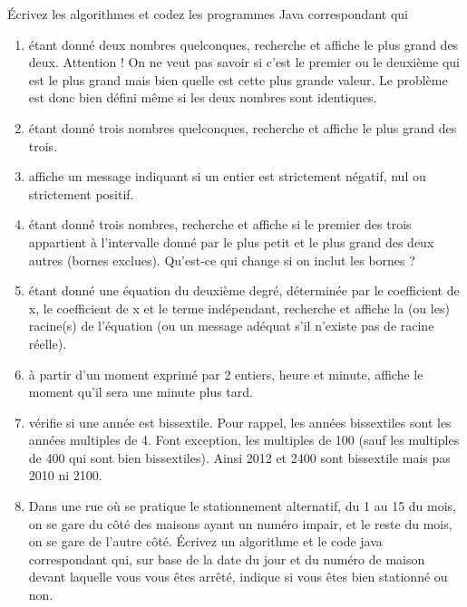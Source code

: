 \documentclass[11pt,a4paper]{article}
\begin{document}
            \par
        
        \'Ecrivez les algorithmes et codez les programmes Java correspondant qui 
          
					\begin{enumerate}
				
			\item \'etant donn\'e deux nombres quelconques, recherche et affiche le plus
              grand des deux. Attention ! On ne veut pas savoir si c'est le premier ou le deuxi\`eme qui est
              le plus grand mais bien quelle est cette plus grande valeur. Le probl\`eme est donc bien d\'efini
              m\^eme si les deux nombres sont identiques.
            
			\item \'etant donn\'e trois nombres quelconques, recherche et affiche le plus grand des trois.
			\item affiche un message indiquant si un entier est strictement n\'egatif, nul ou strictement positif.
			\item \'etant donn\'e trois nombres, recherche et affiche si le premier des 
            trois appartient \`a l'intervalle donn\'e par le plus petit et le plus grand des deux autres (bornes exclues). 
            Qu'est-ce qui change si on inclut les bornes ?
			\item \'etant donn\'e une \'equation du deuxi\`eme degr\'e, d\'etermin\'ee par le coefficient de x\texttwosuperior  , le coefficient de x et le terme ind\'ependant, 
            recherche et affiche la (ou les) racine(s) de l'\'equation (ou un message ad\'equat s'il n'existe pas de racine r\'eelle).
			\item \`a partir d'un moment exprim\'e par 2 entiers, heure et minute, affiche le moment qu'il sera une minute plus tard.
			\item v\'erifie si une ann\'ee est bissextile. Pour rappel, les ann\'ees bissextiles sont les ann\'ees multiples de 4.
             Font exception, les multiples de 100 (sauf les multiples de 400 qui sont bien bissextiles). Ainsi 2012 et 2400 sont bissextile mais pas 2010 ni 2100.
			\item Dans une rue o\`u se pratique le stationnement alternatif, du 1 au 15 du mois, on se gare du c\^ot\'e des maisons ayant un num\'ero impair, 
            et le reste du mois, on se gare de l'autre c\^ot\'e.
            \'Ecrivez un algorithme et le code java correspondant qui, sur base de la date du jour et du num\'ero de maison devant laquelle
            vous vous \^etes arr\^et\'e, indique si vous \^etes bien stationn\'e ou non.
					\end{enumerate}
				
            \par
        
				
\end{document}
